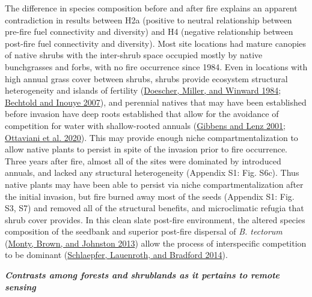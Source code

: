 \documentclass[
  12pt,
]{article}
\begin{document}
The difference in species composition before and after fire explains an
apparent contradiction in results between H2a (positive to neutral
relationship between pre-fire fuel connectivity and diversity) and H4
(negative relationship between post-fire fuel connectivity and
diversity). Most site locations had mature canopies of native shrubs
with the inter-shrub space occupied mostly by native bunchgrasses and
forbs, with no fire occurrence since 1984. Even in locations with high
annual grass cover between shrubs, shrubs provide ecosystem structural
heterogeneity and islands of fertility
(\protect\hyperlink{ref-Doescher1984}{Doescher, Miller, and Winward
1984}; \protect\hyperlink{ref-Bechtold2007}{Bechtold and Inouye 2007}),
and perennial natives that may have been established before invasion
have deep roots established that allow for the avoidance of competition
for water with shallow-rooted annuals
(\protect\hyperlink{ref-Gibbens2001}{Gibbens and Lenz 2001};
\protect\hyperlink{ref-Ottaviani2020}{Ottaviani et al. 2020}). This may
provide enough niche compartmentalization to allow native plants to
persist in spite of the invasion prior to fire occurrence. Three years
after fire, almost all of the sites were dominated by introduced
annuals, and lacked any structural heterogeneity (Appendix S1: Fig.
S6c). Thus native plants may have been able to persist via niche
compartmentalization after the initial invasion, but fire burned away
most of the seeds (Appendix S1: Fig. S3, S7) and removed all of the
structural benefits, and microclimatic refugia that shrub cover
provides. In this clean slate post-fire environment, the altered species
composition of the seedbank and superior post-fire dispersal of \emph{B.
tectorum} (\protect\hyperlink{ref-Monty2013}{Monty, Brown, and Johnston
2013}) allow the process of interspecific competition to be dominant
(\protect\hyperlink{ref-Schlaepfer2014}{Schlaepfer, Lauenroth, and
Bradford 2014}).

\textbf{\emph{Contrasts among forests and shrublands as it pertains to
remote sensing}}
\end{document}
